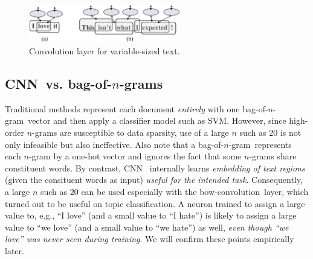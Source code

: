 \documentclass[11pt,letterpaper]{article}
\newcommand{\cnn}{CNN}
\newcommand{\bconv}{bow-convolution}
\newcommand{\bongram}{bag-of-$n$-gram}
\newcommand{\bongrams}{bag-of-$n$-grams}
\begin{document}
\begin{figure}
\centering
\includegraphics[width=2.6in]{txtconv}
\vspace{-0.15in}
\caption{\label{fig:txtconv} \footnotesize %
Convolution layer for variable-sized text.  
}
\end{figure}

\subsection{\cnn\ vs. \bongrams}
\label{sec:cnn-vs-bow}
Traditional 
methods represent each document {\em entirely} with 
one \bongram\ vector 
and then apply a classifier model such as SVM. 
However, 
since %
high-order $n$-grams are 
susceptible to data sparsity, use of a large $n$ such as 20 is not only 
infeasible but also ineffective.  
Also 
note that a \bongram\ represents each $n$-gram by a one-hot vector 
and ignores the fact that some $n$-grams share constituent words.  
%
By contrast, \cnn\  %
internally learns {\em embedding of text regions} (given the consituent words as input) 
{\em useful for the intended task}.  
Consequently, 
a large $n$ such as 20 can be used especially with the \bconv\ layer, 
which turned out to be useful on topic classification.
A neuron 
trained to assign a large value to, e.g., ``I love'' (and a small value to ``I hate'') 
is likely to assign a large value to ``we love'' (and a small value to ``we hate'') 
as well, {\em even though ``we love'' was never seen during training}.  
We will confirm these points empirically later.  
\end{document}
